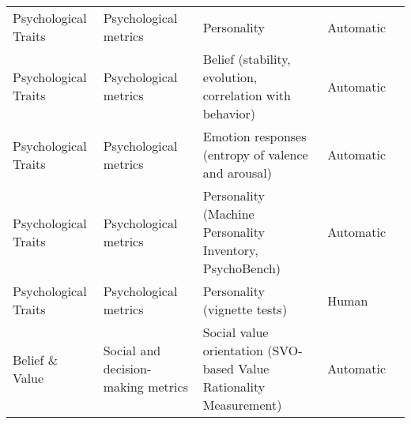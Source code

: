 \begin{small}
\begin{center}
\begin{longtable}{@{}p{}p{}p{}p{}p{}@{}}
Psychological Traits    & Psychological metrics & Personality                                                                                                                                 & Automatic         & \cite{shao2023character}                                                                                                             \\
Psychological Traits    & Psychological metrics & Belief (stability, evolution, correlation with behavior)                                                                                    & Automatic         & \cite{shao2023character}                                                                                                                                 \\
Psychological Traits    & Psychological metrics & Emotion responses (entropy of valence and arousal)                                                                                          & Automatic         & \cite{shao2023character}                                                                                                                                \\
Psychological Traits    & Psychological metrics & Personality (Machine Personality Inventory, PsychoBench)                                                                                    & Automatic         & \cite{NEURIPS2023_21f7b745}                                               \\
Psychological Traits    & Psychological metrics & Personality (vignette tests)                                                                                                                & Human             & \cite{NEURIPS2023_21f7b745}                                               \\
Belief \& Value        & Social and decision-making metrics  & Social value orientation (SVO-based Value Rationality Measurement)                                                                          & Automatic         & \cite{zhang2023heterogeneous}                                                                                                                                \\
\end{longtable}
\end{center}
\end{small}
\twocolumn